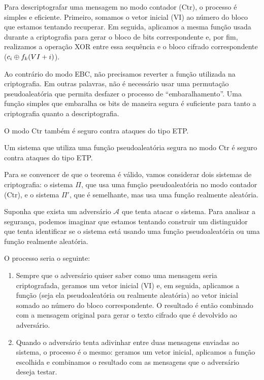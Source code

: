 Para descriptografar uma mensagem no modo contador (Ctr), o processo é simples e eficiente.
Primeiro, somamos o vetor inicial (VI) ao número do bloco que estamos tentando recuperar.
Em seguida, aplicamos a mesma função usada durante a criptografia para gerar o bloco de bits correspondente e, por fim, realizamos a operação XOR entre essa sequência e o bloco cifrado correspondente ($c_i \oplus f_k(VI + i)$).

Ao contrário do modo EBC, não precisamos reverter a função utilizada na criptografia.
Em outras palavras, não é necessário usar uma permutação pseudoaleatória que permita desfazer o processo de ``embaralhamento''.
Uma função simples que embaralha os bits de maneira segura é suficiente para tanto a criptografia quanto a descriptografia.

O modo Ctr também é seguro contra ataques do tipo ETP.

\begin{theorem}
Um sistema que utiliza uma função pseudoaleatória segura no modo Ctr é seguro contra ataques do tipo ETP.
\end{theorem}

Para se convencer de que o teorema é válido, vamos considerar dois sistemas de criptografia:
o sistema $\Pi$, que usa uma função pseudoaleatória no modo contador (Ctr), e o sistema $\Pi'$, que é semelhante, mas usa uma função realmente aleatória.

Suponha que exista um adversário $\mathcal{A}$ que tenta atacar o sistema.
Para analisar a segurança, podemos imaginar que estamos tentando construir um distinguidor que tenta identificar se o sistema está usando uma função pseudoaleatória ou uma função realmente aleatória.

O processo seria o seguinte:

\begin{enumerate}
\item Sempre que o adversário quiser saber como uma mensagem seria criptografada, geramos um vetor inicial (VI) e, em seguida, aplicamos a função (seja ela pseudoaleatória ou realmente aleatória) ao vetor inicial somado ao número do bloco correspondente.
  O resultado é então combinado com a mensagem original para gerar o texto cifrado que é devolvido ao adversário.
\item Quando o adversário tenta adivinhar entre duas mensagens enviadas ao sistema, o processo é o mesmo:
  geramos um vetor inicial, aplicamos a função escolhida e combinamos o resultado com as mensagens que o adversário deseja testar.
\end{enumerate}

